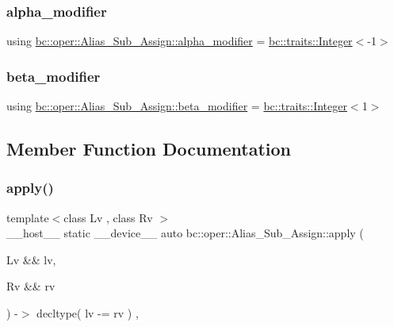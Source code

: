 \subsubsection{\texorpdfstring{alpha\+\_\+modifier}{alpha\_modifier}}
{\footnotesize\ttfamily using \hyperlink{structbc_1_1oper_1_1Alias__Sub__Assign_a5ba31eaac25a5aa2465dbd9693e43886}{bc\+::oper\+::\+Alias\+\_\+\+Sub\+\_\+\+Assign\+::alpha\+\_\+modifier} =  \hyperlink{structbc_1_1traits_1_1Integer}{bc\+::traits\+::\+Integer}$<$-\/1$>$}

\mbox{\label{structbc_1_1oper_1_1Alias__Sub__Assign_a6e0907ffcf3b224294ee441a17cbe22c}} 
\subsubsection{\texorpdfstring{beta\+\_\+modifier}{beta\_modifier}}
{\footnotesize\ttfamily using \hyperlink{structbc_1_1oper_1_1Alias__Sub__Assign_a6e0907ffcf3b224294ee441a17cbe22c}{bc\+::oper\+::\+Alias\+\_\+\+Sub\+\_\+\+Assign\+::beta\+\_\+modifier} =  \hyperlink{structbc_1_1traits_1_1Integer}{bc\+::traits\+::\+Integer}$<$1$>$}



\subsection{Member Function Documentation}
\mbox{\label{structbc_1_1oper_1_1Alias__Sub__Assign_a65827a9261b00d81d8724e623309f380}} 
\subsubsection{\texorpdfstring{apply()}{apply()}}
{\footnotesize\ttfamily template$<$class Lv , class Rv $>$ \\
\+\_\+\+\_\+host\+\_\+\+\_\+ static \+\_\+\+\_\+device\+\_\+\+\_\+ auto bc\+::oper\+::\+Alias\+\_\+\+Sub\+\_\+\+Assign\+::apply (\begin{DoxyParamCaption}\item[{Lv \&\&}]{lv,  }\item[{Rv \&\&}]{rv }\end{DoxyParamCaption}) -\/$>$ decltype( lv -\/= rv ) \hspace{0.3cm}{\ttfamily [inline]}, {\ttfamily [static]}}

